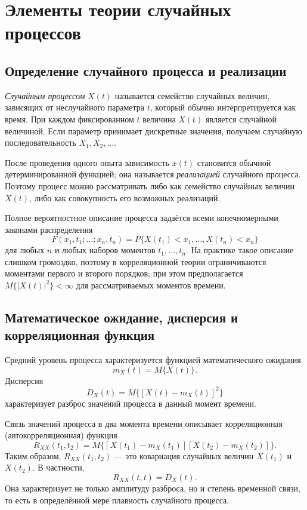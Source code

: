 \section{Элементы теории случайных процессов}
\label{sec:random-processes}

\subsection{Определение случайного процесса и реализации}

\emph{Случайным процессом} $X(t)$ называется семейство случайных величин,
зависящих от неслучайного параметра $t$, который обычно интерпретируется как
время. При каждом фиксированном $t$ величина $X(t)$ является случайной
величиной. Если параметр принимает дискретные значения, получаем случайную
последовательность $X_1,X_2,\ldots$.

После проведения одного опыта зависимость $x(t)$ становится обычной
детерминированной функцией; она называется \emph{реализацией} случайного
процесса. Поэтому процесс можно рассматривать либо как семейство случайных
величин $X(t)$, либо как совокупность его возможных реализаций.

Полное вероятностное описание процесса задаётся всеми конечномерными законами
распределения
\[
    F(x_1,t_1;\ldots;x_n,t_n)
    =P\{X(t_1)<x_1,\ldots,X(t_n)<x_n\}
\]
для любых $n$ и любых наборов моментов $t_1,\ldots,t_n$. На практике такое
описание слишком громоздко, поэтому в корреляционной теории ограничиваются
моментами первого и второго порядков; при этом предполагается
$M\{|X(t)|^2\}<\infty$ для рассматриваемых моментов времени.

\subsection{Математическое ожидание, дисперсия и корреляционная функция}

Средний уровень процесса характеризуется функцией математического ожидания
\[
    m_X(t)=M\{X(t)\}.
\]
Дисперсия
\[
    D_X(t)=M\{[X(t)-m_X(t)]^2\}
\]
характеризует разброс значений процесса в данный момент времени.

Связь значений процесса в два момента времени описывает корреляционная
(автокорреляционная) функция
\[
    R_{XX}(t_1,t_2)
    =M\{[X(t_1)-m_X(t_1)][X(t_2)-m_X(t_2)]\}.
\]
Таким образом, $R_{XX}(t_1,t_2)$ --- это ковариация случайных величин
$X(t_1)$ и $X(t_2)$. В частности,
\[
    R_{XX}(t,t)=D_X(t).
\]
Она характеризует не только амплитуду разброса, но и степень временной связи,
то есть в определённой мере плавность случайного процесса.


